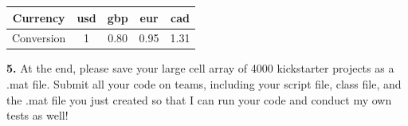 \documentclass[11pt]{article}
\begin{document}
 \begin{center}
     \begin{tabular}{c | c | c | c | c}
          Currency & usd & gbp & eur & cad \\ 
          \hline
          Conversion & 1 & 0.80 & 0.95 & 1.31 
     \end{tabular}
 \end{center}
 
 \bigskip
 \noindent \textbf{5.} At the end, please save your large cell array of 4000 kickstarter projects as a .mat file. Submit all your code on teams, including your script file, class file, and the .mat file you just created so that I can run your code and conduct my own tests as well! 
 
 
\end{document}
